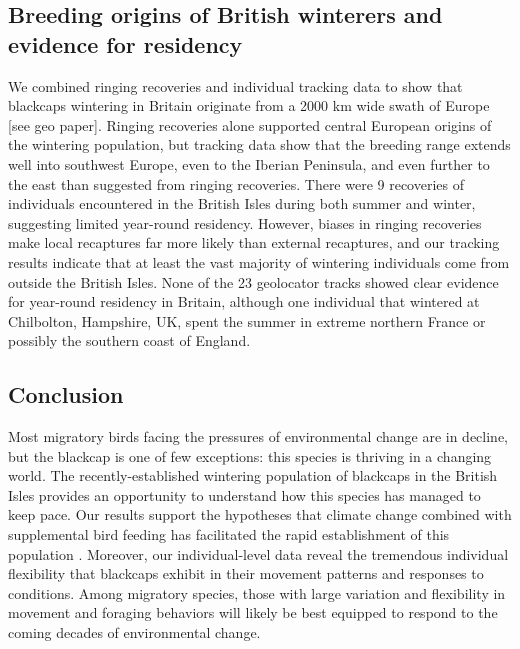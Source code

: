 \documentclass[a4paper, twoside]{templates/ociamthesis}
\begin{document}
\hypertarget{breeding-origins-of-british-winterers-and-evidence-for-residency}{%
\subsection{Breeding origins of British winterers and evidence for residency}\label{breeding-origins-of-british-winterers-and-evidence-for-residency}}

We combined ringing recoveries and individual tracking data to show that blackcaps wintering in Britain originate from a 2000 km wide swath of Europe {[}see geo paper{]}. Ringing recoveries alone supported central European origins of the wintering population, but tracking data show that the breeding range extends well into southwest Europe, even to the Iberian Peninsula, and even further to the east than suggested from ringing recoveries. There were 9 recoveries of individuals encountered in the British Isles during both summer and winter, suggesting limited year-round residency. However, biases in ringing recoveries make local recaptures far more likely than external recaptures, and our tracking results indicate that at least the vast majority of wintering individuals come from outside the British Isles. None of the 23 geolocator tracks showed clear evidence for year-round residency in Britain, although one individual that wintered at Chilbolton, Hampshire, UK, spent the summer in extreme northern France or possibly the southern coast of England.

\hypertarget{conclusion-1}{%
\subsection{Conclusion}\label{conclusion-1}}

Most migratory birds facing the pressures of environmental change are in decline, but the blackcap is one of few exceptions: this species is thriving in a changing world. The recently-established wintering population of blackcaps in the British Isles provides an opportunity to understand how this species has managed to keep pace. Our results support the hypotheses that climate change combined with supplemental bird feeding has facilitated the rapid establishment of this population \autocite{plummerSupplementaryFeedingGardens2015}. Moreover, our individual-level data reveal the tremendous individual flexibility that blackcaps exhibit in their movement patterns and responses to conditions. Among migratory species, those with large variation and flexibility in movement and foraging behaviors will likely be best equipped to respond to the coming decades of environmental change.
\end{document}
